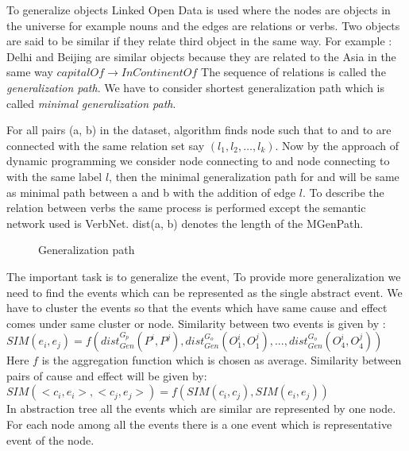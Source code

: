 \documentclass[journal,onecolumn,11pt]{IEEEtran}
\begin{document}
To generalize objects Linked Open Data is used where the nodes are objects in the universe for example nouns and the edges are relations or verbs. Two objects are said to be similar if they relate third object in the same way.
For example : Delhi and Beijing are similar objects because they are related to the Asia in the same way  $capitalOf \xrightarrow{} InContinentOf$  
The sequence of relations is called the \textit{generalization path}.
We have to consider shortest generalization path which is called \textit{minimal generalization path}.

For all pairs (a, b) in the dataset, algorithm finds node  such that  to  and  to  are connected with the same relation set say $(l_1, l_2, \dots, l_k)$. Now by the approach of dynamic programming we consider node  connecting to  and node  connecting to  with the same label $l$, then the minimal generalization path for  and  will be same as minimal path between a and b with the addition of edge $l$.
To describe the relation between verbs the same process is performed except the semantic network used is VerbNet.
dist(a, b) denotes the length of the MGenPath.


\begin{figure}[h!]
    \centering
    \def\svgwidth{0.35\columnwidth}
    
    
    \caption{Generalization path}
\end{figure}
The important task is to generalize the event, To provide more generalization we need to find the events which can be represented as the single abstract event. We have to cluster the events so that the events which have same cause and effect comes under same cluster or node. Similarity between two events is given by :\\
$SIM(e_i, e_j) = f(dist^{G_p}_{Gen}(P^i, P^j), dist^{G_o}_{Gen}(O^i_1, O^j_1), ..., dist^{G_o}_{Gen}(O^i_4, O^j_4)) $\\
Here $f$ is the aggregation function which is chosen as average.
Similarity between pairs of cause and effect will be given by:\\
$SIM(<c_i, e_i>,<c_j , e_j>) = f(SIM(c_i,c_j ), SIM(e_i, e_j))$\\
In abstraction tree all the events which are similar are represented by one node. For each node  among all the events there is a one event which is representative event of the node.
\end{document}

